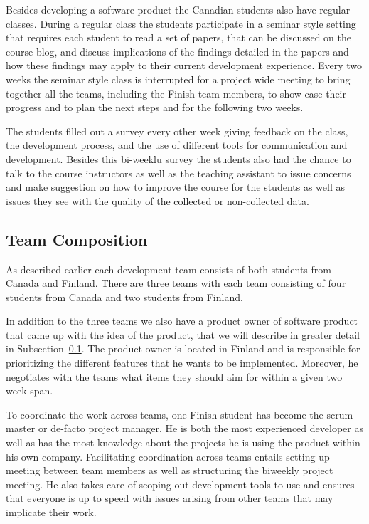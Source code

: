 Besides developing a software product the Canadian students also have regular classes.
During a regular class the students participate in a seminar style setting that requires each student to read a set of papers, that can be discussed on the course blog, and discuss implications of the findings detailed in the papers and how these findings may apply to their current development experience.
Every two weeks the seminar style class is interrupted for a project wide meeting to bring together all the teams, including the Finish team members, to show case their progress and to plan the next steps and for the following two weeks.

The students filled out a survey every other week giving feedback on the class, the development process, and the use of different tools for communication and development.
Besides this bi-weeklu survey the students also had the chance to talk to the course instructors as well as the teaching assistant to issue concerns and make suggestion on how to improve the course for the students as well as issues they see with the quality of the collected or non-collected data.

\subsection{Team Composition}
As described earlier each development team consists of both students from Canada and Finland.
There are three teams with each team consisting of four students from Canada and two students from Finland.

In addition to the three teams we also have a product owner of software product that came up with the idea of the product, that we will describe in greater detail in Subsection~\ref{}.
The product owner is located in Finland and is responsible for prioritizing the different features that he wants to be implemented.
Moreover, he negotiates with the teams what items they should aim for within a given two week span. 

To coordinate the work across teams, one Finish student has become the scrum master or de-facto project manager.
He is both the most experienced developer as well as has the most knowledge about the projects he is using the product within his own company.
Facilitating coordination across teams entails setting up meeting between team members as well as structuring the biweekly project meeting.
He also takes care of scoping out development tools to use and ensures that everyone is up to speed with issues arising from other teams that may implicate their work.

